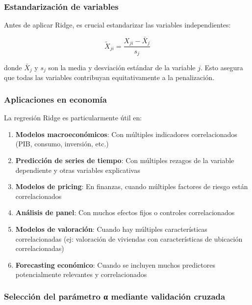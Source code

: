 \documentclass[
  doc,
  floatsintext,
  longtable,
  a4paper,
  nolmodern,
  notxfonts,
  notimes,
  12pt,
  colorlinks=true,linkcolor=blue,citecolor=blue,urlcolor=blue]{apa7}
\begin{document}
\subsubsection{Estandarización de
variables}\label{estandarizaciuxf3n-de-variables}

Antes de aplicar Ridge, es crucial estandarizar las variables
independientes:

\[
\tilde{X}_{ji} = \frac{X_{ji} - \bar{X}_j}{s_j}
\]

donde \(\bar{X}_j\) y \(s_j\) son la media y desviación estándar de la
variable \(j\). Esto asegura que todas las variables contribuyan
equitativamente a la penalización.

\subsubsection{Aplicaciones en
economía}\label{aplicaciones-en-economuxeda-1}

La regresión Ridge es particularmente útil en:

\begin{enumerate}
\def\labelenumi{\arabic{enumi}.}
\item
  \textbf{Modelos macroeconómicos}: Con múltiples indicadores
  correlacionados (PIB, consumo, inversión, etc.)
\item
  \textbf{Predicción de series de tiempo}: Con múltiples rezagos de la
  variable dependiente y otras variables explicativas
\item
  \textbf{Modelos de pricing}: En finanzas, cuando múltiples factores de
  riesgo están correlacionados
\item
  \textbf{Análisis de panel}: Con muchos efectos fijos o controles
  correlacionados
\item
  \textbf{Modelos de valoración}: Cuando hay múltiples características
  correlacionadas (ej: valoración de viviendas con características de
  ubicación correlacionadas)
\item
  \textbf{Forecasting económico}: Cuando se incluyen muchos predictores
  potencialmente relevantes y correlacionados
\end{enumerate}

\subsubsection{Selección del parámetro α mediante validación
cruzada}\label{selecciuxf3n-del-paruxe1metro-ux3b1-mediante-validaciuxf3n-cruzada}
\end{document}
